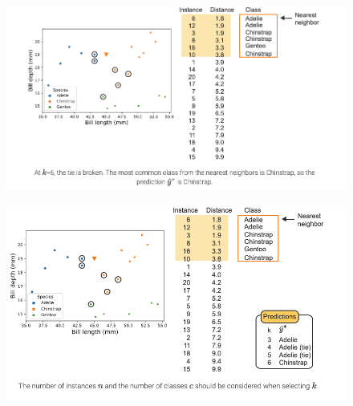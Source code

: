 \documentclass[8pt,dvipsnames]{beamer}
\begin{document}
\begin{frame}
	\begin{figure}[ht]
		\centering
		\includegraphics[width=\linewidth]{imgs/knn_26.png}
	\end{figure}
\end{frame}

\begin{frame}
	\begin{figure}[ht]
		\centering
		\includegraphics[width=\linewidth]{imgs/knn_27.png}
	\end{figure}
\end{frame}
\end{document}
